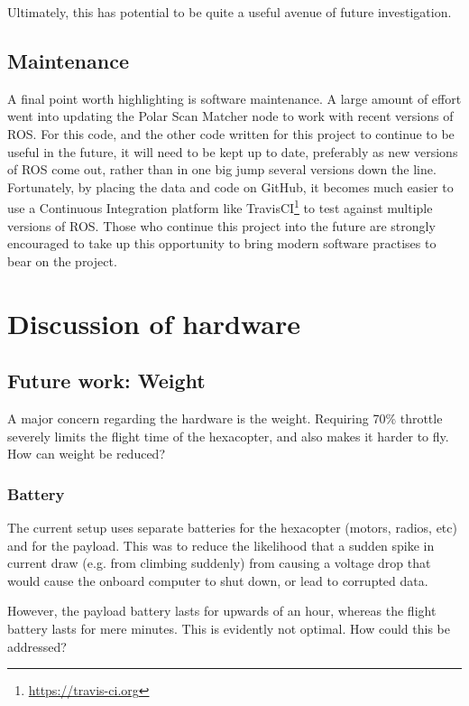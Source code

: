 \documentclass[12pt,oneside,a4paper]{book}
\begin{document}
Ultimately, this has potential to be quite a useful avenue of future
investigation.

\subsection{Maintenance}
\label{sec:maintenance}

A final point worth highlighting is software maintenance. A large
amount of effort went into updating the Polar Scan Matcher node to
work with recent versions of ROS. For this code, and the other code
written for this project to continue to be useful in the future, it
will need to be kept up to date, preferably as new versions of ROS
come out, rather than in one big jump several versions down the
line. Fortunately, by placing the data and code on GitHub, it becomes
much easier to use a Continuous Integration platform like
TravisCI\footnote{\url{https://travis-ci.org}} to test against
multiple versions of ROS. Those who continue this project into the
future are strongly encouraged to take up this opportunity to bring
modern software practises to bear on the project.

\section{Discussion of hardware}
\label{sec:discussion-hardware}
\subsection{Future work: Weight}
\label{sec:weight}

A major concern regarding the hardware is the weight. Requiring 70\%
throttle severely limits the flight time of the hexacopter, and also
makes it harder to fly. How can weight be reduced?

\subsubsection{Battery}
\label{sec:battery}

The current setup uses separate batteries for the hexacopter (motors,
radios, etc) and for the payload. This was to reduce the likelihood
that a sudden spike in current draw (e.g. from climbing suddenly) from
causing a voltage drop that would cause the onboard computer to shut
down, or lead to corrupted data.

However, the payload battery lasts for upwards of an hour, whereas the
flight battery lasts for mere minutes. This is evidently not
optimal. How could this be addressed?
\end{document}
